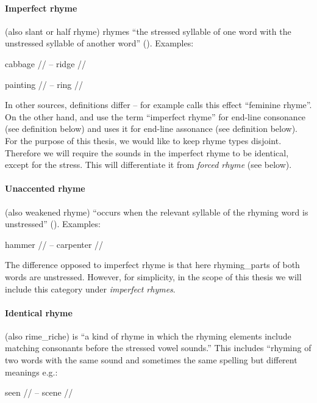 \paragraph{Imperfect rhyme} (also slant or half rhyme)  rhymes ``the stressed syllable of one word with the unstressed syllable of another word'' (\cite{bergman2017litcharts}). Examples: 

cabbage // -- ridge //

painting // -- ring //

\noindent In other sources, definitions differ -- for example \cite{literarydevices2020} calls this effect ``feminine rhyme''.  On the other hand, \cite{oxforddict2008literary} and \cite{britannica} use the term ``imperfect rhyme'' for end-line consonance (see definition below) and \cite{vanphonological} uses it for end-line assonance (see definition below). For the purpose of this thesis, we would like to keep rhyme types disjoint. Therefore we will require the sounds in the imperfect rhyme to be identical, except for the stress. This will differentiate it from \textit{forced rhyme} (see below).


\paragraph{Unaccented rhyme} (also weakened rhyme) ``occurs when the relevant syllable of the rhyming word is unstressed'' (\cite{britannica}). Examples: 

hammer // -- carpenter //

\noindent The difference opposed to imperfect rhyme is that here \gls{rhyming_part}s of both words are unstressed. However, for simplicity, in the scope of this thesis we will include this category under \textit{imperfect rhymes}.


\paragraph{Identical rhyme} (also \gls{rime_riche}) is ``a kind of rhyme in which the rhyming elements include matching consonants before the stressed vowel sounds.'' This includes ``rhyming of two words with the same sound and sometimes the same spelling but different meanings e.g.:

 seen // -- scene //
 
